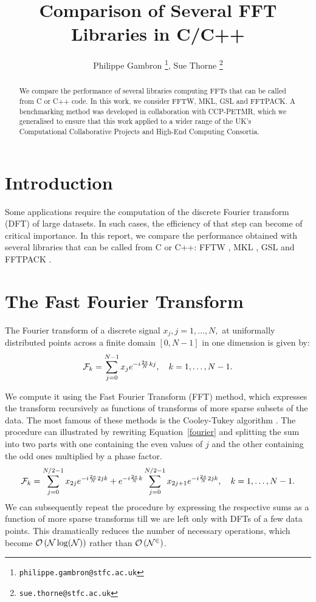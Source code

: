 \documentclass[12pt, a4paper]{article}
\date{}
\begin{document}
\title{Comparison of Several FFT Libraries in C/C++}
\author{Philippe Gambron \thanks{\texttt{philippe.gambron{@}stfc.ac.uk}}, Sue Thorne \thanks{\texttt{sue.thorne{@}stfc.ac.uk}}}
\maketitle
\begin{abstract}
We compare the performance of several libraries computing FFTs that can be 
called from C or C++ code. In this work, we consider FFTW, MKL, GSL and 
FFTPACK. A benchmarking method was developed in collaboration with CCP-PETMR, 
which we generalised to ensure that this work applied to a wider range of the 
UK's Computational Collaborative Projects and High-End Computing Consortia.
\end{abstract}
\section{Introduction}
Some applications require the computation of the discrete Fourier transform 
(DFT) of large datasets. In such cases, the efficiency of that step can 
become of critical importance. In this report, we compare the performance 
obtained with several libraries that can be called from C or C++:  FFTW \cite{fftw}, MKL \cite{mkl}, GSL \cite{gsl} and FFTPACK \cite{fftpack}.

\section{The Fast Fourier Transform}

The Fourier transform of a discrete signal $x_j, j=1,\ldots,N,$ at uniformally distributed points across a finite domain $[0,N-1]$ in one dimension is given by:
\begin{equation}\label{fourier}
{\cal F}_k=\sum_{j=0}^{N-1} x_j e^{-i\frac{2\pi}{N}kj}, \quad k=1,\ldots,N-1.
\end{equation}

We compute it using the Fast Fourier Transform (FFT) method, which expresses 
the transform recursively as functions of transforms of more sparse subsets 
of the data. The most famous of these methods is the Cooley-Tukey algorithm 
\cite{CT}. The procedure can illustrated by rewriting Equation~\ref{fourier} 
and splitting the sum into two parts with one containing the even values of 
$j$ and the other containing the odd ones multiplied by a phase factor.
\begin{equation}\label{ct}
{\cal F}_k=\sum_{j=0}^{N/2-1}x_{2j}e^{-i\frac{2\pi}{N}2jk}+e^{-i\frac{2\pi}{N}k}\sum_{j=0}^{N/2-1}x_{2j+1}e^{-i\frac{2\pi}{N}2jk}, \quad k=1,\ldots, N-1.
\end{equation}
We can subsequently repeat the procedure by expressing the respective sums as a function of more sparse transforms till we are left only with DFTs of a few data points. This dramatically reduces the number of necessary operations, which become  $\cal{O}\left(N\log(N)\right)$ rather than $\cal{O}\left(N^2\right)$.
\end{document}
